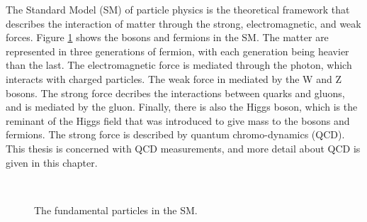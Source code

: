 The Standard Model (SM) of particle physics is the theoretical framework that describes the interaction of matter through the strong, electromagnetic, and weak forces.
Figure \ref{Theory:SM} shows the bosons and fermions in the SM.
The matter are represented in three generations of fermion, with each generation being heavier than the last. 
The electromagnetic force is mediated through the photon, which interacts with charged particles.
The weak force in mediated by the W and Z bosons.
The strong force decribes the interactions between quarks and gluons, and is mediated by the gluon.
Finally, there is also the Higgs boson, which is the reminant of the Higgs field that was introduced to give mass to the bosons and fermions.
The strong force is described by quantum chromo-dynamics (QCD).
This thesis is concerned with QCD measurements, and more detail about QCD is given in this chapter.


\begin{figure}
\centering
\mbox{
                              }
\caption[The fundamental particles in the SM]{
The fundamental particles in the SM.
\label{Theory:SM}}
\end{figure}

